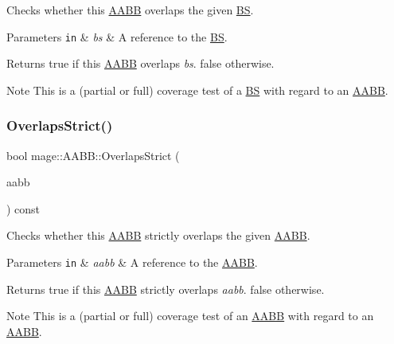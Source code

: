 Checks whether this \hyperlink{classmage_1_1_a_a_b_b}{A\+A\+BB} overlaps the given \hyperlink{classmage_1_1_b_s}{BS}.


\begin{DoxyParams}[1]{Parameters}
\mbox{\tt in}  & {\em bs} & A reference to the \hyperlink{classmage_1_1_b_s}{BS}. \\
\hline
\end{DoxyParams}
\begin{DoxyReturn}{Returns}
{\ttfamily true} if this \hyperlink{classmage_1_1_a_a_b_b}{A\+A\+BB} overlaps {\itshape bs}. {\ttfamily false} otherwise. 
\end{DoxyReturn}
\begin{DoxyNote}{Note}
This is a (partial or full) coverage test of a \hyperlink{classmage_1_1_b_s}{BS} with regard to an \hyperlink{classmage_1_1_a_a_b_b}{A\+A\+BB}. 
\end{DoxyNote}
\hypertarget{classmage_1_1_a_a_b_b_a00628d5ed2bf73021bbb3cdf94049580}{}\label{classmage_1_1_a_a_b_b_a00628d5ed2bf73021bbb3cdf94049580} 
\subsubsection{\texorpdfstring{Overlaps\+Strict()}{OverlapsStrict()}\hspace{0.1cm}{\footnotesize\ttfamily [1/2]}}
{\footnotesize\ttfamily bool mage\+::\+A\+A\+B\+B\+::\+Overlaps\+Strict (\begin{DoxyParamCaption}\item[{const \hyperlink{classmage_1_1_a_a_b_b}{A\+A\+BB} \&}]{aabb }\end{DoxyParamCaption}) const\hspace{0.3cm}{\ttfamily [noexcept]}}

Checks whether this \hyperlink{classmage_1_1_a_a_b_b}{A\+A\+BB} strictly overlaps the given \hyperlink{classmage_1_1_a_a_b_b}{A\+A\+BB}.


\begin{DoxyParams}[1]{Parameters}
\mbox{\tt in}  & {\em aabb} & A reference to the \hyperlink{classmage_1_1_a_a_b_b}{A\+A\+BB}. \\
\hline
\end{DoxyParams}
\begin{DoxyReturn}{Returns}
{\ttfamily true} if this \hyperlink{classmage_1_1_a_a_b_b}{A\+A\+BB} strictly overlaps {\itshape aabb}. {\ttfamily false} otherwise. 
\end{DoxyReturn}
\begin{DoxyNote}{Note}
This is a (partial or full) coverage test of an \hyperlink{classmage_1_1_a_a_b_b}{A\+A\+BB} with regard to an \hyperlink{classmage_1_1_a_a_b_b}{A\+A\+BB}. 
\end{DoxyNote}
\hypertarget{classmage_1_1_a_a_b_b_ac2f7270ec51acb91aed4965f135a53a9}{}\label{classmage_1_1_a_a_b_b_ac2f7270ec51acb91aed4965f135a53a9} 
